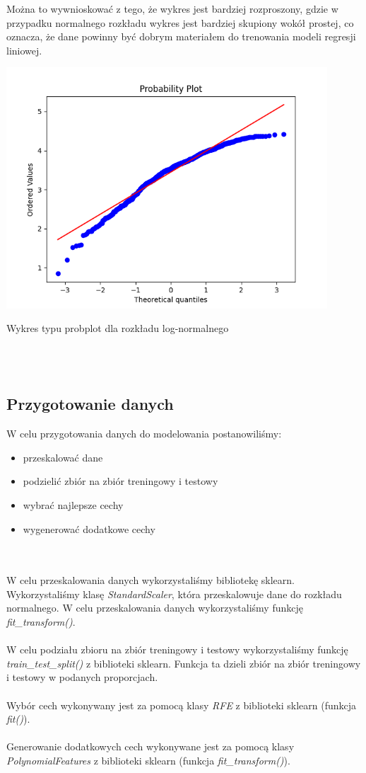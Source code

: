 \documentclass[11pt, a4paper, notitlepage]{report}
\begin{document}
Można to wywnioskować z tego, że wykres jest bardziej rozproszony, gdzie w przypadku normalnego rozkładu wykres jest bardziej skupiony wokół prostej, co oznacza, że dane powinny być dobrym materiałem do trenowania modeli regresji liniowej.
\\
\begin{center}
	\small
	\includegraphics[width=0.9\textwidth]{graphics/data_analysis/log_probplot}
	\caption{Wykres typu probplot dla rozkładu log-normalnego}
\end{center}
\\ \\
\subsection{Przygotowanie danych}
W celu przygotowania danych do modelowania postanowiliśmy:
\begin{itemize}
	\item przeskalować dane
	\item podzielić zbiór na zbiór treningowy i testowy
	\item wybrać najlepsze cechy
	\item wygenerować dodatkowe cechy
\end{itemize}
\\ \\
W celu przeskalowania danych wykorzystaliśmy bibliotekę sklearn. Wykorzystaliśmy klasę \textit{StandardScaler}, która przeskalowuje dane do rozkładu normalnego. W celu przeskalowania danych wykorzystaliśmy funkcję \textit{fit\_transform()}.
\\ \\
W celu podziału zbioru na zbiór treningowy i testowy wykorzystaliśmy funkcję \textit{train\_test\_split()} z biblioteki sklearn. Funkcja ta dzieli zbiór na zbiór treningowy i testowy w podanych proporcjach.
\\ \\
Wybór cech wykonywany jest za pomocą klasy \textit{RFE} z biblioteki sklearn (funkcja \textit{fit()}).
\\ \\
Generowanie dodatkowych cech wykonywane jest za pomocą klasy \textit{PolynomialFeatures} z biblioteki sklearn (funkcja \textit{fit\_transform()}).
\\ \\
\end{document}
